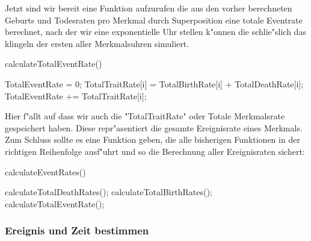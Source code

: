\documentclass[11pt, a4paper, german]{article}
\theoremstyle{plain}
\begin{document}
	 Jetzt sind wir bereit eine Funktion aufzurufen die aus den vorher berechneten Geburts und Todesraten pro Merkmal durch Superposition eine totale Eventrate berechnet, nach der wir eine exponentielle Uhr stellen k"onnen die schlie"slich das klingeln der ersten aller Merkmalsuhren simuliert.
	 \begin{algorithm}[H]
 		\caption{calculateTotalEventRate()}
 		\begin{algorithmic}[1]
 			\State TotalEventRate = 0;
 				\State TotalTraitRate[i] = TotalBirthRate[i] + TotalDeathRate[i];
 				\State TotalEventRate += TotalTraitRate[i];
 			\EndFor
 		\end{algorithmic}
 	\end{algorithm}
 	Hier f"allt auf dass wir auch die "{}TotalTraitRate"{} oder Totale Merkmalsrate gespeichert haben. Diese repr"asentiert die gesamte Ereignisrate eines Merkmals.\\
 	Zum Schluss sollte es eine Funktion geben, die alle bisherigen Funktionen in der richtigen Reihenfolge ausf"uhrt und so die Berechnung aller Ereignisraten sichert:
 	\begin{algorithm}[H]
 		\caption{calculateEventRates()}
 		\begin{algorithmic}[1]
 			\State calculateTotalDeathRates();
 			\State calculateTotalBirthRates();
 			\State calculateTotalEventRate();
 		\end{algorithmic}
 	\end{algorithm}
	
	\subsubsection{Ereignis und Zeit bestimmen}
	
\end{document}
